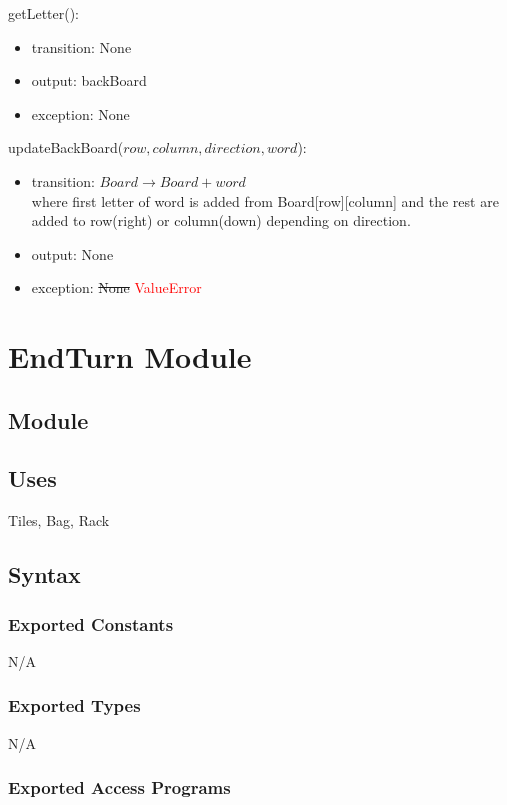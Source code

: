 \documentclass[12pt]{article}
\begin{document}
\noindent getLetter():
\begin{itemize}
\item transition: None
\item output: backBoard
\item exception: None
\end{itemize}

\noindent updateBackBoard($row, column, direction, word$):
\begin{itemize}
\item transition: $Board \rightarrow Board + word$ \\
where first letter of word is added from Board[row][column] and the rest are added to row(right) or column(down) depending on direction.
\item output: None
\item exception: \sout{None} \textcolor{red}{ValueError}
\end{itemize}

\newpage

\section* {EndTurn Module}

\subsection*{Module}

\subsection* {Uses}

Tiles, Bag, Rack

\subsection* {Syntax}

\subsubsection* {Exported Constants}
N/A
\subsubsection* {Exported Types}

N/A

\subsubsection* {Exported Access Programs}
\end{document}
